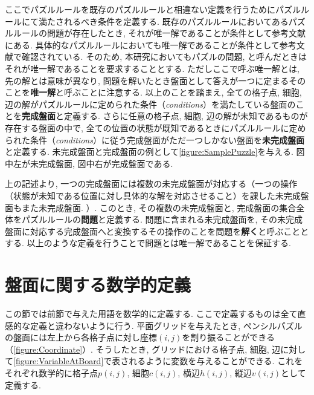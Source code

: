 ここでパズルルールを既存のパズルルールと相違ない定義を行うためにパズルルールにて満たされるべき条件を定義する. 既存のパズルルールにおいてあるパズルルールの問題が存在したとき, それが唯一解であることが条件として参考文献にある. 具体的なパズルルールにおいても唯一解であることが条件として参考文献で確認されている. そのため, 本研究においてもパズルの問題, と呼んだときはそれが唯一解であることを要求することとする. ただしここで呼ぶ唯一解とは, 先の解とは意味が異なり, 問題を解いたとき盤面として答えが一つに定まるそのことを\textbf{唯一解}と呼ぶことに注意する.
以上のことを踏まえ, 全ての格子点, 細胞, 辺の解がパズルルールに定められた条件（\textit{conditions}）を満たしている盤面のことを\textbf{完成盤面}と定義する. さらに任意の格子点, 細胞, 辺の解が未知であるものが存在する盤面の中で, 全ての位置の状態が既知であるときにパズルルールに定められた条件（\textit{conditions}）に従う完成盤面がただ一つしかない盤面を\textbf{未完成盤面}と定義する. 未完成盤面と完成盤面の例として\cref{figure:SamplePuzzle}を与える. 図中左が未完成盤面, 図中右が完成盤面である.

上の記述より, 一つの完成盤面には複数の未完成盤面が対応する（一つの操作（状態が未知である位置に対し具体的な解を対応させること）を課した未完成盤面もまた未完成盤面. ）. このとき, その複数の未完成盤面と, 完成盤面の集合全体をパズルルールの\textbf{問題}と定義する. 問題に含まれる未完成盤面を, その未完成盤面に対応する完成盤面へと変換するその操作のことを問題を\textbf{解く}と呼ぶこととする.
以上のような定義を行うことで問題とは唯一解であることを保証する.

\section{盤面に関する数学的定義}\label{section:MathematicalDefinition}
この節では前節で与えた用語を数学的に定義する. ここで定義するものは全て直感的な定義と違わないように行う.
平面グリッドを与えたとき, ペンシルパズルの盤面には左上から各格子点に対し座標$(i,j)$を割り振ることができる（\cref{figure:Coordinate}）. そうしたとき, グリッドにおける格子点, 細胞, 辺に対して\cref{figure:VariableAtBoard}で表されるように変数を与えることができる.
これをそれぞれ数学的に格子点$p(i,j)$, 細胞$c(i,j)$, 横辺$h(i,j)$, 縦辺$v(i,j)$として定義する.


